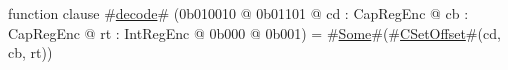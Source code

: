 function clause #\hyperref[sailMIPSzdecode]{decode}# (0b010010 @ 0b01101 @ cd : CapRegEnc @ cb : CapRegEnc @ rt : IntRegEnc @ 0b000 @ 0b001) = #\hyperref[sailMIPSzSome]{Some}#(#\hyperref[sailMIPSzCSetOffset]{CSetOffset}#(cd, cb, rt))
